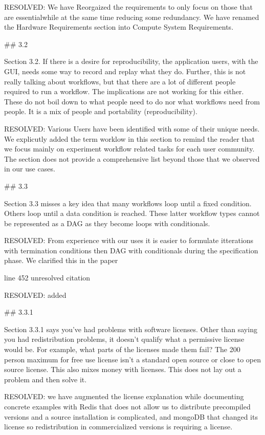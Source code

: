     RESOLVED: We have Reorgaized the requirements to only focus on those that are essentialwhile at the same time reducing some redundancy. We have renamed the Hardware Requirements section into Compute System Requirements.

## 3.2

Section 3.2. If there is a desire for reproducibility, the application users, with the GUI, needs some way to record and replay what they do. Further, this is not really talking about workflows, but that there are a lot of different people required to run a workflow. The implications are not working for this either. These do not boil down to what people need to do nor what workflows need from people. It is a mix of people and portability (reproducibility).

    RESOLVED: Various Users have been identified with some of their unique needs.
    We explicutly added the term worklow in this section to remind the reader that we focus mainly on experiment workflow related tasks for each user community. The section does not provide a comprehensive list beyond those that we observed in our use cases.

## 3.3

Section 3.3 misses a key idea that many workflows loop until a fixed condition. Others loop until a data condition is reached. These latter workflow types cannot be represented as a DAG as they become loops with conditionals.

    RESOLVED: From experience with our uses it is easier to formulate itterations with termination conditions then DAG with conditionals during the specification phase. We clarified this in the paper

line 452 unresolved citation

    RESOLVED: added

## 3.3.1

Section 3.3.1 says you've had problems with software licenses. Other than saying you had redistribution problems, it doesn't qualify what a permissive license would be. For example, what parts of the licenses made them fail? The 200 person maximum for free use license isn't a standard open source or close to open source license. This also mixes money with licenses. This does not lay out a problem and then solve it.

    RESOLVED: we have augmented the license explanation while documenting concrete examples with Redis that does not allow us to distribute precompiled versions and a source installation is complicated, and mongoDB that changed its license so redistribution in commercialized versions is requiring a license. 

